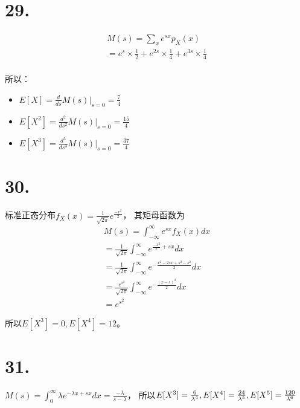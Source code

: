 \documentclass[UTF8]{report}
\begin{document}
    \section*{29.}
        $$\begin{array}{l}
            M(s) = \sum_{x}e^{sx}p_X(x)\\
            = e^s \times \frac{1}{2} + e^{2s} \times \frac{1}{4} + e^{3s} \times \frac{1}{4}\\
        \end{array}$$

        所以：
        \begin{itemize}
            \item $E[X] = \frac{d}{ds}M(s)|_{s = 0} = \frac{7}{4}$
            \item $E[X^2] = \frac{d^2}{ds^2}M(s)|_{s = 0} = \frac{15}{4}$
            \item $E[X^3] = \frac{d^3}{ds^3}M(s)|_{s = 0} = \frac{37}{4}$
        \end{itemize}
    \section*{30.}
        标准正态分布$f_X(x) = \frac{1}{\sqrt{2\pi}}e^{\frac{-x^2}{2}}$，
        其矩母函数为
        $$\begin{array}{l}
            M(s) = \int_{-\infty}^{\infty}e^{sx}f_X(x)dx\\
            = \frac{1}{\sqrt{2\pi}}\int_{-\infty}^{\infty}e^{\frac{-x^2}{2} + sx}dx\\
            = \frac{1}{\sqrt{2\pi}}\int_{-\infty}^{\infty}e^{-\frac{x^2 - 2sx + s^2 - s^2}{2}}dx\\
            = \frac{e^{s^2}}{\sqrt{2\pi}}\int_{-\infty}^{\infty}e^{-\frac{(x - s)^2}{2}}dx\\
            = e^{s^2}
        \end{array}$$

        所以$E[X^3] = 0, E[X^4] = 12$。
    \section*{31.}
        $M(s) = \int_{0}^{\infty}\lambda e^{-\lambda x + sx}dx = \frac{-\lambda}{s - \lambda}$，
        所以$E[X^3] = \frac{6}{\lambda^4}, E[X^4] = \frac{24}{\lambda^5},\\ E[X^5] = \frac{120}{\lambda^6}$
\end{document}
